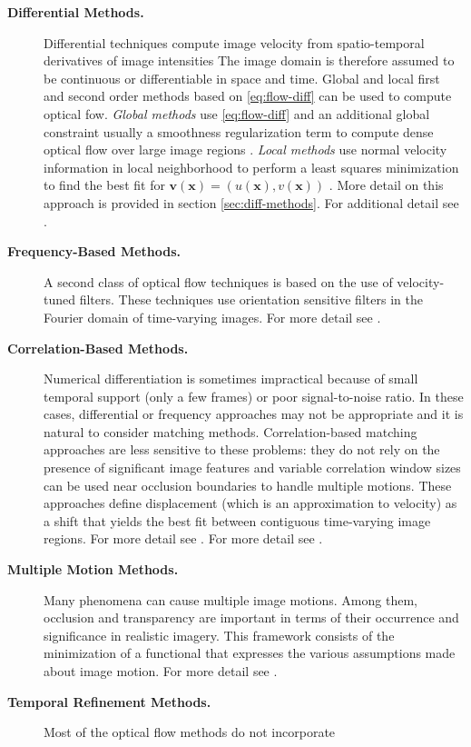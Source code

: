 \documentclass[letterpaper,11pt]{article}
\begin{document}
\begin{description}
\item[\bf{Differential Methods}.] Differential techniques compute image velocity from spatio-temporal derivatives of image intensities The image domain is therefore assumed to be continuous or differentiable in space and
time. Global and local first and second order methods based on \eqref{eq:flow-diff} can be used to compute optical fow. \emph{Global methods} use \eqref{eq:flow-diff} and an additional global constraint usually a smoothness
regularization term to compute dense optical flow over large image regions \citep{Beauchemin:1995,Horn:Schunck:1981}. \emph{Local methods} use normal velocity information in local neighborhood to perform a least squares minimization to find the best fit for $\mathbf{v (\mathbf{x}) } = (u(\mathbf{x}),v(\mathbf{x}))$ \citep{Lucas:Kanade:1981}. More detail on this approach is provided in section \ref{sec:diff-methods}. For additional detail see \citep{Beauchemin:1995}.
\item[\bf{Frequency-Based Methods}.] A second class of optical flow techniques is based on the use of velocity-tuned filters.
These techniques use orientation sensitive filters in the Fourier domain of time-varying images. For more detail see \citep{Beauchemin:1995}.
\item[\bf{Correlation-Based Methods}.] Numerical differentiation is sometimes impractical because of small temporal support (only a few frames) or poor signal-to-noise ratio. In these cases, differential or frequency approaches may not be appropriate and it is natural to consider matching methods. Correlation-based matching approaches are less sensitive to these problems: they do not rely on the presence of significant image features and variable correlation window sizes can be used near occlusion boundaries to handle multiple
motions. These approaches define displacement (which is an approximation to velocity) as a shift that yields the best fit between contiguous time-varying image regions. For more detail see \citep{Beauchemin:1995}. For more detail see \citep{Beauchemin:1995}.
\item[\bf{Multiple Motion Methods}.] Many phenomena can cause multiple image motions. Among them, occlusion and transparency are important in terms of their occurrence and significance in realistic imagery. This framework consists of the minimization of a functional that expresses the various assumptions made about image motion. For more detail see \citep{Beauchemin:1995}.
\item[\bf{Temporal Refinement Methods}.] Most of the optical flow methods do not incorporate

\end{description}
\end{document}
